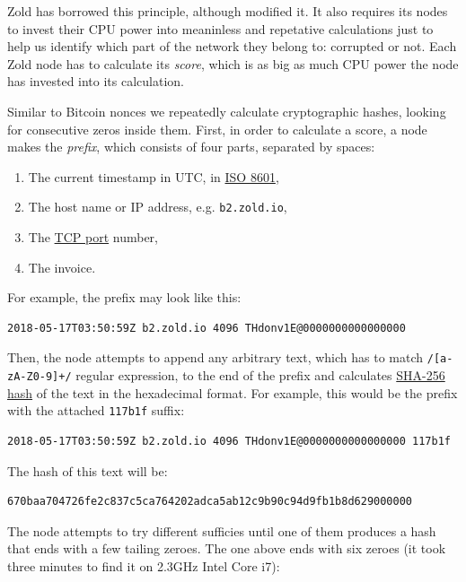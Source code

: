 \documentclass[11pt,oneside]{article}
\newcommand\dd[1]{\colorbox{gray!30}{\texttt{#1}}}
\begin{document}
Zold has borrowed this principle, although modified it. It also requires
its nodes to invest their CPU power into meaninless and repetative
calculations just to help us identify which part of the network they belong to:
corrupted or not. Each Zold node has to calculate its \emph{score},
which is as big as much CPU power the node has invested into its calculation.

Similar to Bitcoin nonces we repeatedly calculate cryptographic hashes,
looking for consecutive zeros inside them. First, in order to calculate a score,
a node makes the \emph{prefix}, which consists of four parts,
separated by spaces:

\begin{enumerate}
\item The current timestamp in UTC, in \href{https://en.wikipedia.org/wiki/ISO_8601}{ISO 8601},
\item The host name or IP address, e.g. \dd{b2.zold.io},
\item The \href{https://en.wikipedia.org/wiki/Port_(computer_networking)}{TCP port} number,
\item The invoice.
\end{enumerate}

For example, the prefix may look like this:

\begin{verbatim}
2018-05-17T03:50:59Z b2.zold.io 4096 THdonv1E@0000000000000000
\end{verbatim}

Then, the node attempts to append any arbitrary text, which has to match
\dd{/[a-zA-Z0-9]+/} regular expression, to the end of the prefix and calculates
\href{https://en.wikipedia.org/wiki/SHA-2}{SHA-256 hash}
of the text in the hexadecimal format. For example, this would be the prefix
with the attached \dd{117b1f} suffix:

\begin{verbatim}
2018-05-17T03:50:59Z b2.zold.io 4096 THdonv1E@0000000000000000 117b1f
\end{verbatim}

The hash of this text will be:

\begin{verbatim}
670baa704726fe2c837c5ca764202adca5ab12c9b90c94d9fb1b8d629000000
\end{verbatim}

The node attempts to try different sufficies until one of them produces
a hash that ends with a few tailing zeroes. The one above ends
with six zeroes
(it took three minutes to find it on 2.3GHz Intel Core i7):
\end{document}
